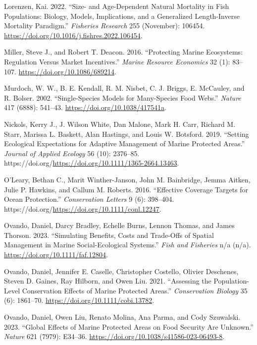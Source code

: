 \documentclass[
  default,
  lineno,
  referee]{sn-jnl}
\newlength{\cslhangindent}
\newenvironment{CSLReferences}[2] %
 {\begin{list}{}{%
  \setlength{\itemindent}{0pt}
  \setlength{\leftmargin}{0pt}
  \setlength{\parsep}{0pt}
  \ifodd #1
   \setlength{\leftmargin}{\cslhangindent}
   \setlength{\itemindent}{-1\cslhangindent}
  \fi
  \setlength{\itemsep}{#2\baselineskip}}}
 {\end{list}}
\begin{document}
\begin{CSLReferences}{1}{0}
Lorenzen, Kai. 2022. {``Size- and Age-Dependent Natural Mortality in
Fish Populations: Biology, Models, Implications, and a Generalized
Length-Inverse Mortality Paradigm.''} \emph{Fisheries Research} 255
(November): 106454. \url{https://doi.org/10.1016/j.fishres.2022.106454}.

Miller, Steve J., and Robert T. Deacon. 2016. {``Protecting Marine
Ecosystems: Regulation Versus Market Incentives.''} \emph{Marine
Resource Economics} 32 (1): 83--107.
\url{https://doi.org/10.1086/689214}.

Murdoch, W. W., B. E. Kendall, R. M. Nisbet, C. J. Briggs, E. McCauley,
and R. Bolser. 2002. {``Single-Species Models for Many-Species Food
Webs.''} \emph{Nature} 417 (6888): 541--43.
\url{https://doi.org/10.1038/417541a}.

Nickols, Kerry J., J. Wilson White, Dan Malone, Mark H. Carr, Richard M.
Starr, Marissa L. Baskett, Alan Hastings, and Louis W. Botsford. 2019.
{``Setting Ecological Expectations for Adaptive Management of Marine
Protected Areas.''} \emph{Journal of Applied Ecology} 56 (10): 2376--85.
https://doi.org/\url{https://doi.org/10.1111/1365-2664.13463}.

O'Leary, Bethan C., Marit Winther-Janson, John M. Bainbridge, Jemma
Aitken, Julie P. Hawkins, and Callum M. Roberts. 2016. {``Effective
Coverage Targets for Ocean Protection.''} \emph{Conservation Letters} 9
(6): 398--404. https://doi.org/\url{https://doi.org/10.1111/conl.12247}.

Ovando, Daniel, Darcy Bradley, Echelle Burns, Lennon Thomas, and James
Thorson. 2023. {``Simulating Benefits, Costs and Trade-Offs of Spatial
Management in Marine Social-Ecological Systems.''} \emph{Fish and
Fisheries} n/a (n/a). \url{https://doi.org/10.1111/faf.12804}.

Ovando, Daniel, Jennifer E. Caselle, Christopher Costello, Olivier
Deschenes, Steven D. Gaines, Ray Hilborn, and Owen Liu. 2021.
{``Assessing the Population{-}Level Conservation Effects of Marine
Protected Areas.''} \emph{Conservation Biology} 35 (6): 1861--70.
\url{https://doi.org/10.1111/cobi.13782}.

Ovando, Daniel, Owen Liu, Renato Molina, Ana Parma, and Cody Szuwalski.
2023. {``Global Effects of Marine Protected Areas on Food Security Are
Unknown.''} \emph{Nature} 621 (7979): E34--36.
\url{https://doi.org/10.1038/s41586-023-06493-8}.


\end{CSLReferences}
\end{document}

